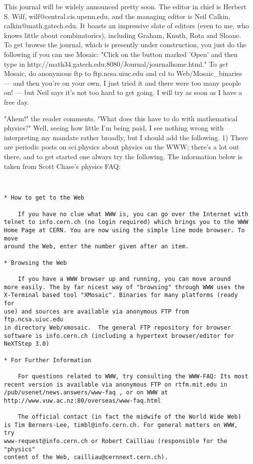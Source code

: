This journal will be widely announced pretty soon.  The editor in chief
is Herbert S.  Wilf, wilf@central.cis.upenn.edu, and the managing editor
is Neil Calkin, calkin@math.gatech.edu.  It boasts an impressive slate
of editors (even to me, who knows little about combinatorics), including
Graham, Knuth, Rota and Sloane.  To get browse the journal, which is
presently under construction, you just do the following if you can use
Mosaic: "Click on the button marked 'Open' and then type in
http://math34.gatech.edu:8080/Journal/journalhome.html."  To \emph{get}
Mosaic, do anonymous ftp to ftp.ncsa.uiuc.edu and cd to
Web/Mosaic_binaries --- and then you're on your own, I just tried it and
there were too many people on! --- but Neil says it's not too hard to
get going.  I will try as soon as I have a free day.

"Ahem!" the reader comments.  "What does this have to do with
mathematical physics?"  Well, seeing how little I'm being paid, I see
nothing wrong with interpreting my mandate rather broadly, but I should
add the following. 1) There are periodic posts on sci.physics about physics
on the WWW; there's a lot out there, and to get started one always try
the following.  The information below is taken from Scott Chase's
physics FAQ:


\begin{verbatim}


* How to get to the Web

   	If you have no clue what WWW is, you can go over the Internet with
telnet to info.cern.ch (no login required) which brings you to the WWW 
Home Page at CERN. You are now using the simple line mode browser. To move 
around the Web, enter the number given after an item. 

* Browsing the Web

	If you have a WWW browser up and running, you can move around
more easily. The by far nicest way of "browsing" through WWW uses the
X-Terminal based tool "XMosaic". Binaries for many platforms (ready for
use) and sources are available via anonymous FTP from ftp.ncsa.uiuc.edu
in directory Web/xmosaic.  The general FTP repository for browser
software is info.cern.ch (including a hypertext browser/editor for
NeXTStep 3.0)

* For Further Information

	For questions related to WWW, try consulting the WWW-FAQ: Its most 
recent version is available via anonymous FTP on rtfm.mit.edu in 
/pub/usenet/news.answers/www-faq , or on WWW at 
http://www.vuw.ac.nz:80/overseas/www-faq.html

	The official contact (in fact the midwife of the World Wide Web) 
is Tim Berners-Lee, timbl@info.cern.ch. For general matters on WWW, try 
www-request@info.cern.ch or Robert Cailliau (responsible for the "physics" 
content of the Web, cailliau@cernnext.cern.ch).
\end{verbatim}
    

